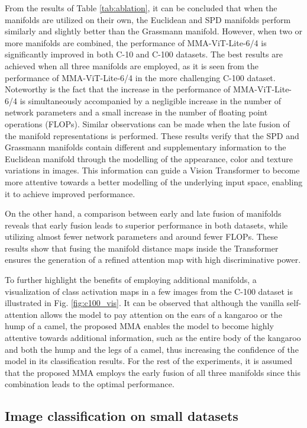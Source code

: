 \documentclass[10pt,twocolumn,letterpaper]{article}
\begin{document}
From the results of Table \ref{tab:ablation}, it can be concluded that when the manifolds are utilized on their own, the Euclidean and SPD manifolds perform similarly and slightly better than the Grassmann manifold. However, when two or more manifolds are combined, the performance of MMA-ViT-Lite-6/4 is significantly improved in both C-10 and C-100 datasets. The best results are achieved when all three manifolds are employed, as it is seen from the performance of MMA-ViT-Lite-6/4 in the more challenging C-100 dataset. Noteworthy is the fact that the increase in the performance of MMA-ViT-Lite-6/4 is simultaneously accompanied by a negligible increase in the number of network parameters and a small increase in the number of floating point operations (FLOPs). Similar observations can be made when the late fusion of the manifold representations is performed. These results verify that the SPD and Grassmann manifolds contain different and supplementary information to the Euclidean manifold through the modelling of the appearance, color and texture variations in images. This information can guide a Vision Transformer to become more attentive towards a better modelling of the underlying input space, enabling it to achieve improved performance.

On the other hand, a comparison between early and late fusion of manifolds reveals that early fusion leads to superior performance in both datasets, while utilizing almost  fewer network parameters and around  fewer FLOPs. These results show that fusing the manifold distance maps inside the Transformer ensures the generation of a refined attention map with high discriminative power.

To further highlight the benefits of employing additional manifolds, a visualization of class activation maps in a few images from the C-100 dataset is illustrated in Fig. \ref{fig:c100_vis}. It can be observed that although the vanilla self-attention allows the model to pay attention on the ears of a kangaroo or the hump of a camel, the proposed MMA enables the model to become highly attentive towards additional information, such as the entire body of the kangaroo and both the hump and the legs of a camel, thus increasing the confidence of the model in its classification results. For the rest of the experiments, it is assumed that the proposed MMA employs the early fusion of all three manifolds since this combination leads to the optimal performance.

\subsection{Image classification on small datasets}
\end{document}
